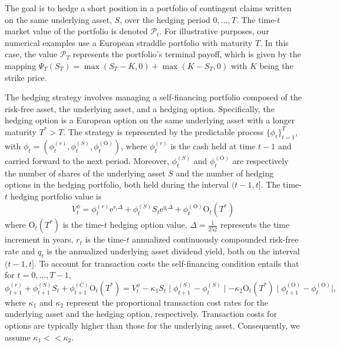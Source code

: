 \documentclass[12pt]{article}
\begin{document}
The goal is to hedge a short position in a portfolio of contingent claims written on the same underlying asset, $S$, over the hedging period $0,\ldots,T$. The time-$t$ market value of the portfolio is denoted $\mathcal{P}_{t}$. For illustrative purposes, our numerical examples use a European straddle portfolio with maturity $T$. In this case, the value $\mathcal{P}_{T}$ represents the portfolio's terminal payoff, which is given by the mapping $\Psi_T(S_{T})=\max(S_{T}-K,0)+\max(K-S_{T},0)$ with $K$ being the strike price.

The hedging strategy involves managing a self-financing portfolio composed of the risk-free asset, the underlying asset, and a hedging option. Specifically, the hedging option is a European option on the same underlying asset with a longer maturity $T^{*}>T$. The strategy is represented by the predictable process
$\{ \phi_{t} \}_{t=1}^{T}$, with $\phi_{t}=(\phi_{t}^{(r)},\phi_{t}^{(S)},\phi^{(\text{O})}_{t})$, where $\phi_{t}^{(r)}$ is the cash held at time $t-1$ and carried forward to the next period. Moreover, $\phi_{t}^{(S)}$ and $\phi^{(\text{O})}_{t}$ are respectively the number of shares of the underlying asset $S$ and the number of hedging options in the hedging portfolio, both held during the interval $(t-1, t]$. The time-$t$ hedging portfolio value is
\begin{equation*}
V_{t}^{\phi}=\phi_{t}^{(r)}\mbox{e}^{r_{t}\Delta}+\phi_{t}^{(S)} S_{t}\mbox{e}^{q_{t}\Delta} + \phi^{(\text{O})}_{t}\text{O}_{t}(T^{*})
\end{equation*}
where $\text{O}_{t}(T^{*})$ is the time-$t$ hedging option value, $\Delta=\frac{1}{252}$ represents the time increment in years, $r_{t}$ is the time-$t$ annualized continuously compounded risk-free rate and $q_{t}$ is the annualized underlying asset dividend yield, both on the interval $(t-1,t]$. To account for transaction costs the self-financing condition entails that for $t=0,\ldots,T-1$,
\begin{equation}
\label{eq:self-financing}
    \phi_{t+1}^{(r)} +\phi_{t+1}^{(S)}S_{t} + \phi^{(C)}_{t+1}\text{O}_{t}(T^{*})= V_{t}^{\phi}-\kappa_{1} S_{t}\mid \phi_{t+1}^{(S)} - \phi_{t}^{(S)}\mid - \kappa_{2} \text{O}_{t}(T^{*})\mid \phi^{(\text{O})}_{t+1} - \phi^{(\text{O})}_{t}\mid,
\end{equation}
where $\kappa_{1}$ and $\kappa_{2}$ represent the proportional transaction cost rates for the underlying asset and the hedging option, respectively. Transaction costs for options are typically higher than those for the underlying asset. Consequently, we assume $\kappa_{1}<<\kappa_{2}$.
\end{document}
